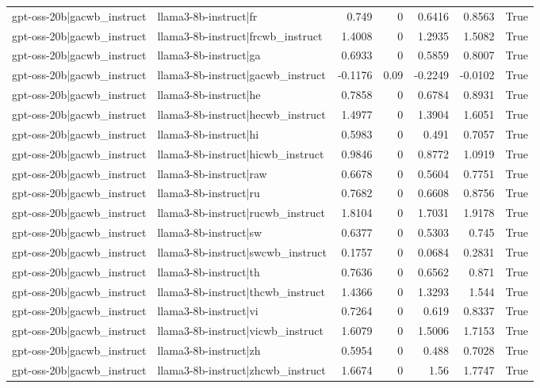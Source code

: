 \begin{table}
\begin{tabular}{l l r r r r l}
gpt-oss-20b|gacwb_instruct & llama3-8b-instruct|fr & 0.749 & 0 & 0.6416 & 0.8563 & True \\
gpt-oss-20b|gacwb_instruct & llama3-8b-instruct|frcwb_instruct & 1.4008 & 0 & 1.2935 & 1.5082 & True \\
gpt-oss-20b|gacwb_instruct & llama3-8b-instruct|ga & 0.6933 & 0 & 0.5859 & 0.8007 & True \\
gpt-oss-20b|gacwb_instruct & llama3-8b-instruct|gacwb_instruct & -0.1176 & 0.09 & -0.2249 & -0.0102 & True \\
gpt-oss-20b|gacwb_instruct & llama3-8b-instruct|he & 0.7858 & 0 & 0.6784 & 0.8931 & True \\
gpt-oss-20b|gacwb_instruct & llama3-8b-instruct|hecwb_instruct & 1.4977 & 0 & 1.3904 & 1.6051 & True \\
gpt-oss-20b|gacwb_instruct & llama3-8b-instruct|hi & 0.5983 & 0 & 0.491 & 0.7057 & True \\
gpt-oss-20b|gacwb_instruct & llama3-8b-instruct|hicwb_instruct & 0.9846 & 0 & 0.8772 & 1.0919 & True \\
gpt-oss-20b|gacwb_instruct & llama3-8b-instruct|raw & 0.6678 & 0 & 0.5604 & 0.7751 & True \\
gpt-oss-20b|gacwb_instruct & llama3-8b-instruct|ru & 0.7682 & 0 & 0.6608 & 0.8756 & True \\
gpt-oss-20b|gacwb_instruct & llama3-8b-instruct|rucwb_instruct & 1.8104 & 0 & 1.7031 & 1.9178 & True \\
gpt-oss-20b|gacwb_instruct & llama3-8b-instruct|sw & 0.6377 & 0 & 0.5303 & 0.745 & True \\
gpt-oss-20b|gacwb_instruct & llama3-8b-instruct|swcwb_instruct & 0.1757 & 0 & 0.0684 & 0.2831 & True \\
gpt-oss-20b|gacwb_instruct & llama3-8b-instruct|th & 0.7636 & 0 & 0.6562 & 0.871 & True \\
gpt-oss-20b|gacwb_instruct & llama3-8b-instruct|thcwb_instruct & 1.4366 & 0 & 1.3293 & 1.544 & True \\
gpt-oss-20b|gacwb_instruct & llama3-8b-instruct|vi & 0.7264 & 0 & 0.619 & 0.8337 & True \\
gpt-oss-20b|gacwb_instruct & llama3-8b-instruct|vicwb_instruct & 1.6079 & 0 & 1.5006 & 1.7153 & True \\
gpt-oss-20b|gacwb_instruct & llama3-8b-instruct|zh & 0.5954 & 0 & 0.488 & 0.7028 & True \\
gpt-oss-20b|gacwb_instruct & llama3-8b-instruct|zhcwb_instruct & 1.6674 & 0 & 1.56 & 1.7747 & True \\

\end{tabular}
\end{table}
